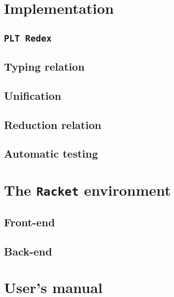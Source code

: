 \documentclass[inz, english, shortabstract]{iithesis}
\newcommand{\Redex}{\texttt{PLT Redex} }
\newcommand{\Racket}{\texttt{Racket} }
\begin{document}
\chapter{Implementation}

\section{\Redex}

\section{Typing relation}

\section{Unification}

\section{Reduction relation}

\section{Automatic testing}


\chapter{The \Racket environment}

\section{Front-end}

\section{Back-end}


\chapter{User's manual}

\printbibliography

\end{document}
